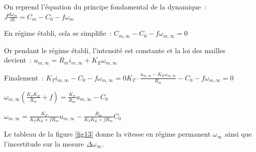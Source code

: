 \ifprof
\begin{corrige}
On reprend l'équation du principe fondamental de la dynamique~: 
\(J\frac{d\omega_{m}}{\text{dt}} = C_{m} - C_{0} - f\omega_{m}\)

En régime établi, cela se simplifie~:
\(C_{m,\infty} - C_{0} - f\omega_{m,\infty} = 0\)

Or pendant le régime établi, l'intensité est constante et la loi des
mailles devient~:
\(u_{m,\infty} = R_{m}i_{m,\infty} + K_{E}\omega_{m,\infty}\)

Finalement~:
\({K_{T}i_{m,\infty} - C_{0} - f\omega_{m,\infty} = 0}\)\({K_{T} \cdot \frac{u_{m,\infty} - K_{E}\omega_{m,\infty}}{R_{m}} - C_{0} - f\omega_{m,\infty} = 0}\)

\({\omega_{m,\infty}\left( \frac{K_{T}K_{E}}{R_{m}} + f \right) = \frac{K_{T}}{R_{m}}u_{m,\infty} - C_{0}}\)

\({\omega_{m,\infty} = \frac{K_{T}}{K_{T}K_{E} + fR_{m}}u_{m,\infty} - \frac{R_{m}}{K_{T}K_{E} + fR_{m}}C_{0}}\)

\end{corrige}
\else
\fi

\ifprof\else
Le tableau de la figure \ref{fig13} donne la vitesse en régime permanent $\omega_{\infty}$ ainsi que l'incertitude sur la mesure $\Delta \omega_{\infty}$.
\fi

\ifprof
\begin{corrige}~\\
\begin{center}
\end{center}
\end{corrige}
\else
\fi


